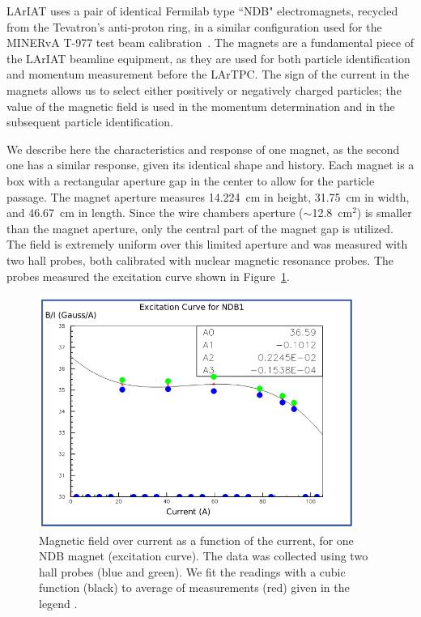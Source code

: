LArIAT uses a pair of identical Fermilab type ``NDB" electromagnets, recycled from the Tevatron's anti-proton ring, in a similar configuration used for the  MINERvA T-977 test beam calibration~\cite{MinervaTestbeam}. 
The magnets are a fundamental piece of the LArIAT beamline equipment, as they are used for both particle identification and momentum measurement before the LArTPC. The sign of the current in the magnets allows us to select either positively or negatively charged particles; the value of the magnetic field is used in the momentum determination and in the subsequent particle identification. 

We describe here the characteristics and response of one magnet, as the second one has a similar response, given its identical shape and history. Each magnet is a box with a rectangular aperture gap in the center to allow for the particle passage.  The magnet aperture measures 14.224~cm in height, 31.75~cm in width, and  46.67~cm in length.  Since the wire chambers aperture ($\sim$12.8~cm$^2$) is smaller than the magnet aperture, only the central part of the magnet gap is utilized. The field is extremely uniform over this limited aperture and was measured with two hall probes, both calibrated with nuclear magnetic resonance probes. The probes measured the excitation curve shown in Figure~\ref{fig:magnet_excitation}. 

\begin{figure}[!h]
\begin{centering}
\vspace{-0.3cm}
\includegraphics[height=3.0in]{Chapter-3/Images/ExcitationCurves.png}
\caption{
{ Magnetic field over current as a function of the current, for one NDB magnet (excitation curve). The data was collected using two hall probes (blue and green). We fit the readings with a cubic function (black) to average of measurements (red) given in the legend \cite{detectorPaper}.}
}
\label{fig:magnet_excitation}
\end{centering}
\end{figure}

